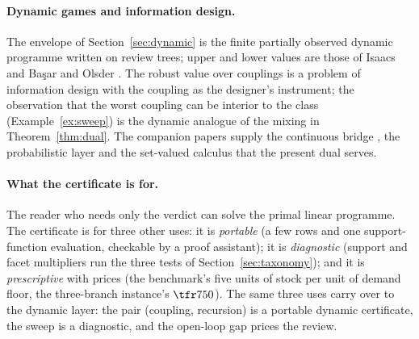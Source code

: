 \paragraph{Dynamic games and information design.} The envelope of Section~\ref{sec:dynamic} is the finite partially observed dynamic programme \cite{Astrom1965,BertsekasShreve1978} written on review trees; upper and lower values are those of Isaacs \cite{Isaacs1965} and Ba\c{s}ar and Olsder \cite{BasarOlsder1999}. The robust value over couplings is a problem of information design \cite{BergemannMorris2019} with the coupling as the designer's instrument; the observation that the worst coupling can be interior to the class (Example~\ref{ex:sweep}) is the dynamic analogue of the mixing in Theorem~\ref{thm:dual}. The companion papers supply the continuous bridge \cite{Abaee2026cert}, the probabilistic layer \cite{Abaee2026prob} and the set-valued calculus \cite{Abaee2026calc} that the present dual serves.

\paragraph{What the certificate is for.} The reader who needs only the verdict can solve the primal linear programme. The certificate is for three other uses: it is \emph{portable} (a few rows and one support-function evaluation, checkable by a proof assistant); it is \emph{diagnostic} (support and facet multipliers run the three tests of Section~\ref{sec:taxonomy}); and it is \emph{prescriptive} with prices (the benchmark's five units of stock per unit of demand floor, the three-branch instance's $\tfr7{50}$). The same three uses carry over to the dynamic layer: the pair (coupling, recursion) is a portable dynamic certificate, the sweep is a diagnostic, and the open-loop gap prices the review.

